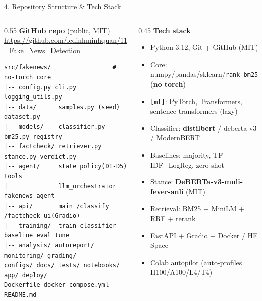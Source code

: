 \documentclass[10pt,aspectratio=169]{beamer}
\begin{document}
\begin{frame}[fragile]{4. Repository Structure \& Tech Stack}
\begin{columns}[T]
\begin{column}{0.55\textwidth}
\textbf{GitHub repo} (public, MIT) \\
\scriptsize \url{https://github.com/ledinhminhquan/11_Fake_News_Detection}

\vspace{0.15cm}
\begin{lstlisting}[basicstyle=\ttfamily\tiny]
src/fakenews/                 # no-torch core
|-- config.py cli.py logging_utils.py
|-- data/      samples.py (seed) dataset.py
|-- models/    classifier.py bm25.py registry
|-- factcheck/ retriever.py stance.py verdict.py
|-- agent/     state policy(D1-D5) tools
|              llm_orchestrator fakenews_agent
|-- api/       main /classify /factcheck ui(Gradio)
|-- training/  train_classifier baseline eval tune
|-- analysis/ autoreport/ monitoring/ grading/
configs/ docs/ tests/ notebooks/ app/ deploy/
Dockerfile docker-compose.yml README.md
\end{lstlisting}
\end{column}
\begin{column}{0.45\textwidth}
\textbf{Tech stack}
\begin{itemize}\small
  \item Python 3.12, Git + GitHub (MIT)
  \item Core: numpy/pandas/sklearn/\texttt{rank\_bm25} (\textbf{no torch})
  \item \texttt{[ml]}: PyTorch, Transformers, sentence-transformers (lazy)
  \item Classifier: \textbf{distilbert} / deberta-v3 / ModernBERT
  \item Baselines: majority, TF-IDF+LogReg, zero-shot
  \item Stance: \textbf{DeBERTa-v3-mnli-fever-anli} (MIT)
  \item Retrieval: BM25 + MiniLM + RRF + rerank
  \item FastAPI + Gradio + Docker / HF Space
  \item Colab autopilot (auto-profiles H100/A100/L4/T4)
\end{itemize}
\end{column}
\end{columns}
\end{frame}
\end{document}
